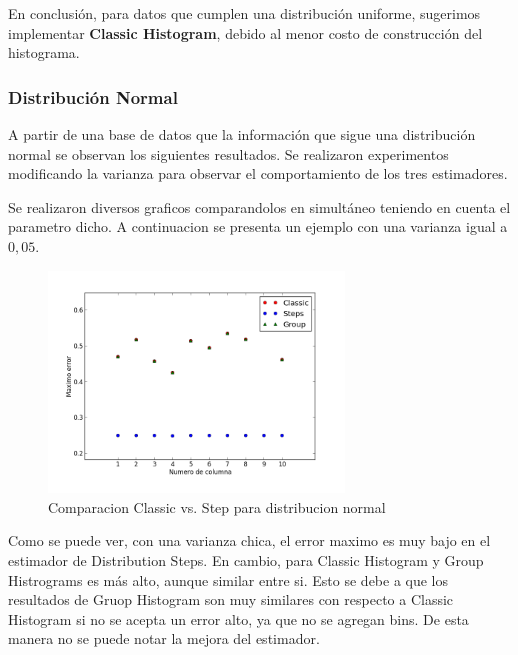 \documentclass[10pt, a4paper,english,spanish,hidelinks]{article}
\begin{document}
En conclusión, para datos que cumplen una distribución uniforme, sugerimos implementar
\textbf{Classic Histogram}, debido al menor costo de construcción del histograma.


\subsubsection{Distribución Normal}

A partir de una base de datos que la información que sigue una distribución normal se observan los siguientes resultados. Se realizaron experimentos modificando la varianza para observar el comportamiento de los tres estimadores.

Se realizaron diversos graficos comparandolos en simultáneo teniendo en cuenta el parametro dicho. 
A continuacion se presenta un ejemplo con una varianza igual a $0,05$. 

\begin{figure}[h!]
  \centering
  \includegraphics[width=0.7\textwidth]{./imagenes/ejb2_normal_t_005.png}
  \caption{Comparacion Classic vs. Step para distribucion normal}
\end{figure}

Como se puede ver, con una varianza chica, el error maximo es muy bajo en el estimador de Distribution Steps. En cambio, para Classic Histogram y Group Histrograms es más alto, aunque similar entre si. Esto se debe a que los resultados de Gruop Histogram son muy similares con respecto a Classic Histogram si no se acepta un error alto, ya que no se agregan bins. De esta manera no se puede notar la mejora del estimador.
\end{document}
